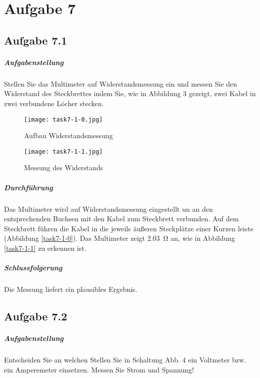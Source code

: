 \chapter{Aufgabe 7}
\section{Aufgabe 7.1}
\paragraph{Aufgabenstellung}
Stellen Sie das Multimeter auf Widerstandsmessung ein und messen Sie den Widerstand des Steckbrettes indem Sie, wie in Abbildung 3 gezeigt, zwei Kabel in zwei verbundene Löcher stecken.

\begin{figure}
	\begin{minipage}[c]{0.48\linewidth}
		\texttt{[image: task7-1-0.jpg]}
		\caption{Aufbau Widerstandsmessung}
		\label{task7-1-0}
	\end{minipage}
	\hfill
	\begin{minipage}[c]{0.485\linewidth}
		\texttt{[image: task7-1-1.jpg]}
		\caption{Messung des Widerstands}
		\label{task7-1-1}
	\end{minipage}
	\label{task7-1}
\end{figure}

\paragraph{Durchführung}
Das Multimeter wird auf Widerstandsmessung eingestellt un an den entsprechenden Buchsen mit den Kabel zum Steckbrett verbunden. Auf dem Steckbrett führen die Kabel in die jeweils äußeren Steckplätze einer Kurzen leiste (Abbildung \vref{task7-1-0}). Das Multimeter zeigt \SI{2,03}{\ohm} an, wie in Abbildung \vref{task7-1-1} zu erkennen ist.

\paragraph{Schlussfolgerung}
Die Messung liefert ein plausibles Ergebnis.

\section{Aufgabe 7.2}
\paragraph{Aufgabenstellung}
Entscheiden Sie an welchen Stellen Sie in Schaltung Abb. 4 ein Voltmeter bzw. ein Amperemeter einsetzen. Messen Sie Strom und Spannung!

